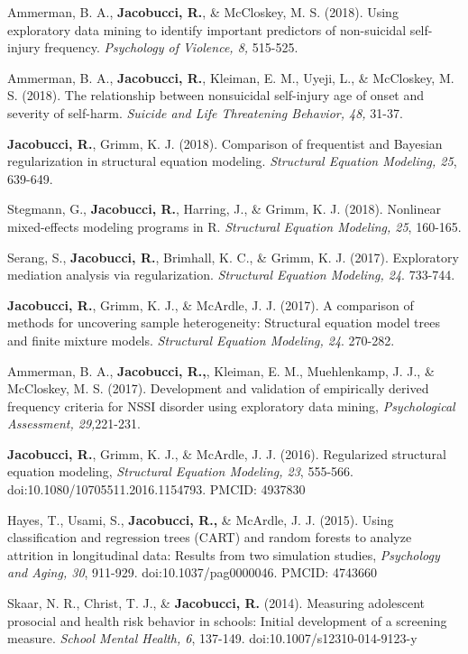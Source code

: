 \documentclass[letterpaper,10pt]{article}
\begin{document}
\begin{etaremune}
	\item Ammerman, B. A., \textbf{Jacobucci, R.}, \& McCloskey, M. S. (2018). Using exploratory data mining to identify important predictors of non-suicidal self-injury frequency. \emph{Psychology of Violence, 8,} 515-525.
	\item Ammerman, B. A., \textbf{Jacobucci, R.}, Kleiman, E. M., Uyeji, L., \& McCloskey, M. S. (2018). The relationship between nonsuicidal self-injury age of onset and severity of self-harm. \emph{Suicide and Life Threatening Behavior, 48,} 31-37.
	\item  \textbf{Jacobucci, R.}, Grimm, K. J. (2018). Comparison of frequentist and Bayesian regularization in structural equation modeling. \emph{Structural Equation Modeling, 25}, 639-649.
	\item Stegmann, G., \textbf{Jacobucci, R.}, Harring, J., \& Grimm, K. J. (2018). Nonlinear mixed-effects modeling programs in R. \emph{Structural Equation Modeling, 25}, 160-165.
	\item Serang, S., \textbf{Jacobucci, R.}, Brimhall, K. C., \& Grimm, K. J. (2017). Exploratory mediation analysis via regularization. \emph{Structural Equation Modeling, 24}. 733-744.
	\item \textbf{Jacobucci, R.}, Grimm, K. J., \& McArdle, J. J. (2017). A comparison of methods for uncovering sample heterogeneity: Structural equation model trees and finite mixture models. \emph{Structural Equation Modeling, 24}. 270-282.
	\item Ammerman, B. A., \textbf{Jacobucci, R.,}, Kleiman, E. M., Muehlenkamp, J. J., \& McCloskey, M. S. (2017). Development and validation of empirically derived frequency criteria for NSSI disorder using exploratory data mining, \emph{Psychological Assessment, 29,}221-231.
	\item \textbf{Jacobucci, R.}, Grimm, K. J., \& McArdle, J. J. (2016). Regularized structural equation modeling, \emph{Structural Equation Modeling, 23}, 555-566. doi:10.1080/10705511.2016.1154793. PMCID: 4937830
	\item Hayes, T., Usami, S., \textbf{Jacobucci, R.,} \& McArdle, J. J. (2015). Using classification and regression trees (CART) and random forests to analyze attrition in longitudinal data: Results from two simulation studies, \emph{Psychology and Aging, 30}, 911-929. doi:10.1037/pag0000046. PMCID: 4743660
	\item Skaar, N. R., Christ, T. J., \& \textbf{Jacobucci, R.} (2014). Measuring adolescent prosocial and health risk behavior in schools: Initial development of a screening measure. \emph{School Mental Health, 6}, 137-149. doi:10.1007/s12310-014-9123-y
	
\end{etaremune}
\end{document}
